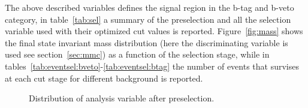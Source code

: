 The above described variables defines the signal region in the b-tag and b-veto category,
in table~\ref{tab:sel} a summary of the preselection and all the selection variable used with their optimized cut values is reported.
Figure~\ref{fig:mass} shows the final state invariant mass distribution (here the \mmc 
discriminating variable is used see section~\ref{sec:mmc}) as a function of the selection stage,
while in tables~\ref{tab:eventsel:bveto}-\ref{tab:eventsel:btag} the number of events that survises at each cut stage for different background is reported.

\begin{figure}[p]
     \begin{center}

    \end{center}
    \caption{Distribution of analysis variable after preselection.}
   \label{fig:selections}
\end{figure}


